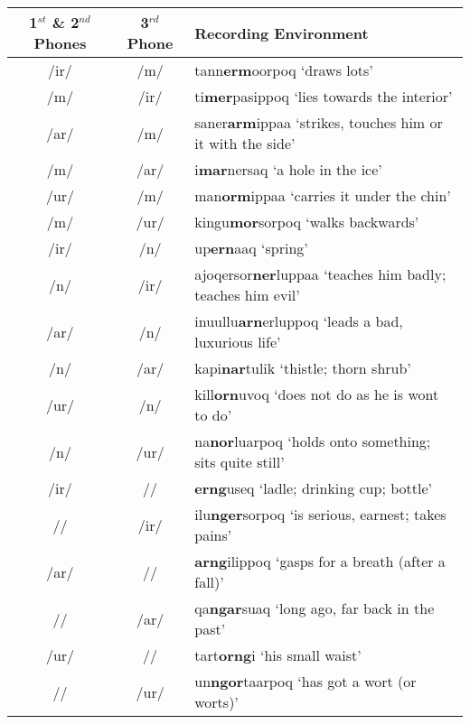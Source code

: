 \documentclass[12pt]{article}
\begin{document}
	\begin{tabular}{|c|c|l|}
	\hline
	\makecell[l]{1$^{st}$ \& 2$^{nd}$ \\ Phones} & 3$^{rd}$ Phone & Recording Environment \\
	\hline
	/ir/ & /m/ & tann\textbf{erm}oorpoq `draws lots'\\
	/m/ & /ir/ & ti\textbf{mer}pasippoq `lies towards the interior'\\
	/ar/ & /m/ & saner\textbf{arm}ippaa `strikes, touches him or it with the side'\\
	/m/ & /ar/ & i\textbf{mar}nersaq `a hole in the ice'\\
	/ur/ & /m/ & man\textbf{orm}ippaa `carries it under the chin'\\
	/m/ & /ur/ & kingu\textbf{mor}sorpoq `walks backwards'\\
	/ir/ & /n/ & up\textbf{ern}aaq `spring' \\
	/n/ & /ir/ & ajoqersor\textbf{ner}luppaa `teaches him badly; teaches him evil'\\
	/ar/ & /n/ & inuullu\textbf{arn}erluppoq `leads a bad, luxurious life'\\
	/n/ & /ar/ & kapi\textbf{nar}tulik `thistle; thorn shrub'\\
	/ur/ & /n/ & kill\textbf{orn}uvoq `does not do as he is wont to do'\\
	/n/ & /ur/ & na\textbf{nor}luarpoq `holds onto something; sits quite still'\\
	/ir/ & /\textipa{N}/ & \textbf{erng}useq `ladle; drinking cup; bottle'\\
	/\textipa{N}/ & /ir/ & ilu\textbf{nger}sorpoq `is serious, earnest; takes pains'\\
	/ar/ & /\textipa{N}/ & \textbf{arng}ilippoq `gasps for a breath (after a fall)'\\
	/\textipa{N}/ & /ar/ & qa\textbf{ngar}suaq `long ago, far back in the past'\\
	/ur/ & /\textipa{N}/ & tart\textbf{orng}i `his small waist'\\
	/\textipa{N}/ & /ur/ & un\textbf{ngor}taarpoq `has got a wort (or worts)'\\
	\hline
	\end{tabular}
	\newpage
\end{document}

